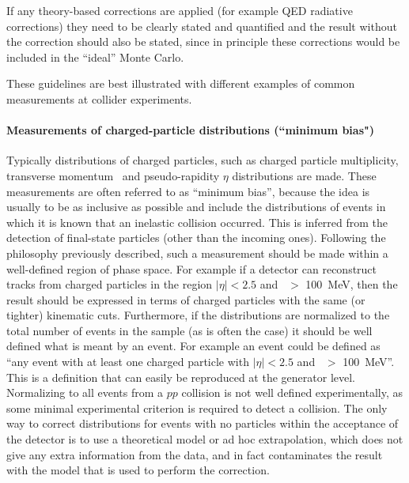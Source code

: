 If any theory-based corrections are applied (for example QED radiative
corrections) they need to be clearly stated and quantified and the
result without the correction should also be stated, since in principle
these corrections would be included in the ``ideal'' Monte Carlo.


These guidelines are best illustrated with different examples of common
measurements at collider experiments.

\paragraph{Measurements of charged-particle distributions (``minimum bias")}

Typically distributions of charged particles, such as charged particle
multiplicity, transverse momentum \pt\ and pseudo-rapidity $\eta$ distributions are made. These measurements
are often referred to as ``minimum bias'', because the idea is usually
to be as inclusive as possible and include the distributions of events
in which it is known that an inelastic collision occurred.  This is
inferred from the detection of final-state particles (other than the
incoming ones). Following the philosophy previously described, such a
measurement should be made within a well-defined region of phase space.
For example if a detector can reconstruct tracks from charged particles
in the region $|\eta| < 2.5$ and \pt\ $>$ 100~MeV, then the result
should be expressed in terms of charged particles with the same
(or tighter) kinematic cuts.  Furthermore, if the distributions are
normalized to the total number of events in the sample (as is often the
case) it should be well defined what is meant by an event. For example
an event could be defined as ``any event with at least one charged
particle with $|\eta| < 2.5$ and \pt\ $>$ 100~MeV''. This is a
definition that can easily be reproduced at the generator level.
Normalizing to all events from a $pp$ collision is not well defined
experimentally, as some minimal experimental criterion is required to
detect a collision. The only way to correct distributions for events
with no particles within the acceptance of the detector is to use a
theoretical model or ad hoc extrapolation, which does not give any extra
information from the data, and in fact contaminates the result with the
model that is used to perform the correction.

